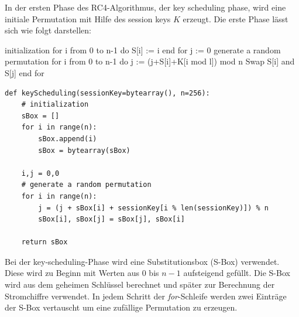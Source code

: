 \documentclass[10pt,a4paper]{article}
\begin{document}
In der ersten Phase des RC4-Algorithmus, der key scheduling phase, wird eine initiale Permutation mit Hilfe des session keys $K$ erzeugt. Die erste Phase lässt sich wie folgt darstellen:\\
\begin{center}
\hspace{5pt}
\begin{minipage}[t]{.35\textwidth}
\begin{algorithm}
{initialization}
for i from 0 to n-1 do
    S[i] := i
end for
j := 0
{generate a random permutation}
for i from 0 to n-1 do
    j := (j+S[i]+K[i mod l]) mod n
    Swap S[i] and S[j]
end for
\end{algorithm}
\end{minipage}\hspace{0.4cm}
\begin{minipage}[t]{.60\textwidth}
  \begin{lstlisting}
def keyScheduling(sessionKey=bytearray(), n=256):
	# initialization
	sBox = []
	for i in range(n):
   		sBox.append(i)
   		sBox = bytearray(sBox)

   	i,j = 0,0
   	# generate a random permutation
   	for i in range(n):
     	j = (j + sBox[i] + sessionKey[i % len(sessionKey)]) % n
    	sBox[i], sBox[j] = sBox[j], sBox[i]

	return sBox
\end{lstlisting}
\end{minipage}
\end{center}

Bei der key-scheduling-Phase wird eine Substitutionsbox (S-Box) verwendet. Diese wird zu Beginn mit Werten aus 0 bis $n-1$ aufsteigend gefüllt. Die S-Box wird aus dem geheimen Schlüssel berechnet und später zur Berechnung der Stromchiffre verwendet. In jedem Schritt der \textit{for}-Schleife werden zwei Einträge der S-Box vertauscht um eine zufällige Permutation zu erzeugen. 
\end{document}
